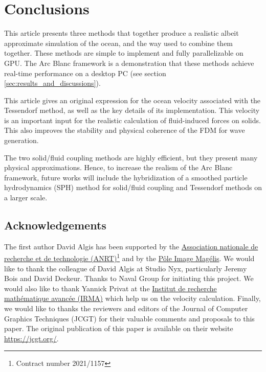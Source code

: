 \documentclass[11pt]{article}
\def\Framework{The Arc Blanc framework\xspace}
\def\framework{the Arc Blanc framework\xspace}
\begin{document}
\section{Conclusions}\label{sec:conclusions}
This article presents three methods that together produce a realistic albeit approximate simulation of the ocean, and the way used to combine them together. %
These methods are simple to implement and fully parallelizable on GPU.
\Framework is a demonstration that these methods achieve real-time performance on a desktop PC (see section \ref{sec:results_and_discussions}).

This article gives an original expression for the ocean velocity associated with the Tessendorf method, as well as the key details of its implementation. This velocity is an important input for the realistic calculation of fluid-induced forces on solids.
This also improves the stability and physical coherence of the FDM for wave generation.

The two solid/fluid coupling methods are highly efficient, but they present many physical approximations.
Hence, to increase the realism of \framework, future works will include the hybridization of a smoothed particle hydrodynamics (SPH) method for solid/fluid coupling and Tessendorf methods on a larger scale. %

\subsection*{Acknowledgements}
The first author David Algis has been supported by the \href{https://www.anrt.asso.fr/fr}{Association nationale de recherche et de technologie (ANRT)}\footnote{Contract number 2021/1157} and by the \href{https://www.magelis.org/}{Pôle Image Magélis}. We would like to thank the colleague of David Algis at Studio Nyx, particularly Jeremy Bois and David Deckeur. Thanks to Naval Group for initiating this project. We would also like to thank Yannick Privat at the \href{https://irma.math.unistra.fr/}{Institut de recherche mathématique avancée (IRMA)} which help us on the velocity calculation. Finally, we would like to thanks the reviewers and editors of the Journal of Computer Graphics Techniques (JCGT) for their valuable comments and proposals to this paper. The original publication of this paper is available on their website \url{https://jcgt.org/}.
\end{document}
